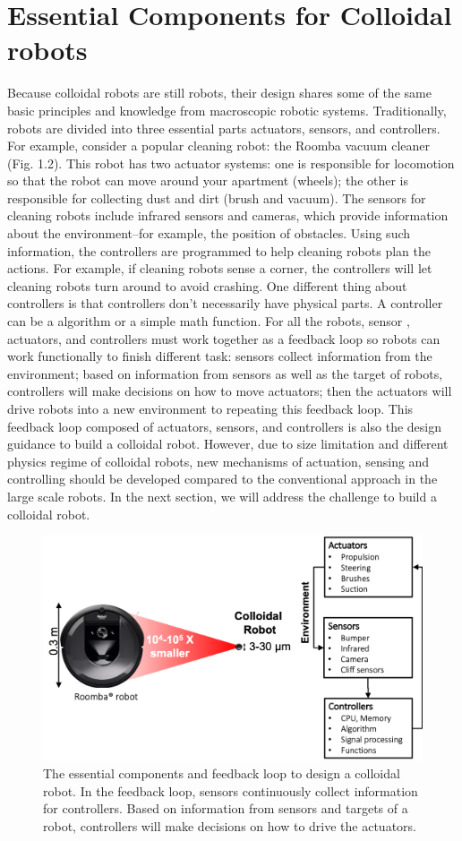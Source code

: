 \section{Essential Components for Colloidal robots}
Because colloidal robots are still robots, their design shares some of the same basic principles and knowledge from  macroscopic robotic systems.  Traditionally, robots are divided into three essential parts actuators, sensors, and controllers. For example, consider a popular cleaning robot: the Roomba vacuum cleaner (Fig. 1.2).  This robot has two actuator systems: one is responsible for locomotion so that the robot can move around your apartment (wheels); the other is responsible for collecting dust and dirt (brush and vacuum).
The sensors for cleaning robots include infrared  sensors and cameras, which provide information about the environment--for example, the position of obstacles. Using such information, the controllers are programmed  to help cleaning robots plan  the actions. For example, if cleaning robots sense a corner, the controllers will let cleaning robots turn around to avoid crashing. One different thing about controllers is that controllers don't necessarily have physical parts. A controller can be a algorithm or a simple math function.  For all the robots, sensor , actuators, and controllers must work together as a feedback loop so robots can work functionally to finish different task: sensors collect information from the environment; based on information from sensors as well as the target of robots,  controllers will make decisions  on how to move actuators; then the actuators will drive robots into a new environment to repeating this feedback loop. This feedback loop composed of actuators, sensors,  and controllers is also the design guidance to build a colloidal robot. However, due to size limitation and different physics regime of colloidal robots, new mechanisms of actuation, sensing and controlling should be developed compared to the conventional approach in the large scale robots.  In the next section, we will address the challenge to build a colloidal robot. 

\begin{figure}
\centering
\includegraphics[width=12cm]{figures/1_2.png}
\caption{The essential components and feedback loop to design a colloidal robot. In the feedback loop, sensors continuously collect information for controllers. Based on  information from sensors and targets of a robot, controllers will make decisions on how to drive the actuators.}
\label{fig:1.2}
\end{figure}

